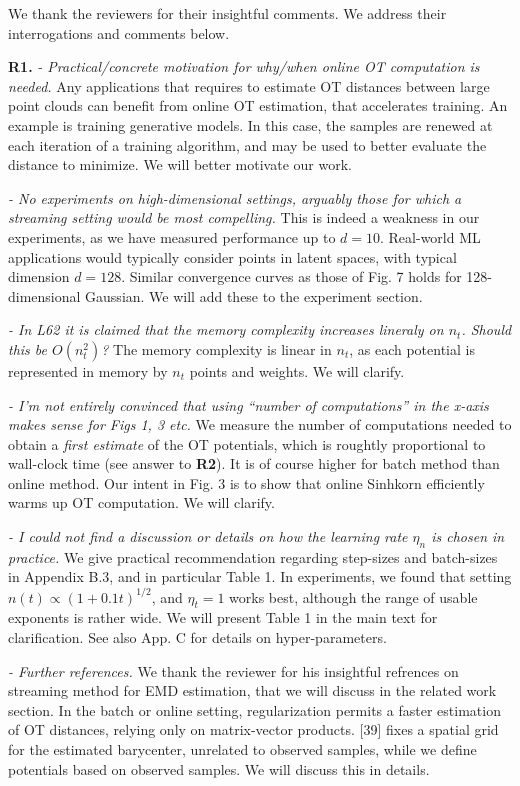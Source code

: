 \documentclass{article}
\begin{document}
We thank the reviewers for their insightful comments. We address their interrogations and comments below.

\textbf{R1.} \textit{- Practical/concrete motivation for why/when online OT computation is needed.} Any applications that requires to estimate OT distances between large point clouds can benefit from online OT estimation, that accelerates training. An example is training generative models. In this case, the samples are renewed at each iteration of a training algorithm, and may be used to better evaluate the distance to minimize. We will better motivate our work.

\textit{- No experiments on high-dimensional settings, arguably those for which a streaming setting would be most compelling.} This is indeed a weakness in our experiments, as we have measured performance up to $d=10$. Real-world ML applications would typically consider points in latent spaces, with typical dimension $d=128$. Similar convergence curves as those of Fig. 7 holds for 128-dimensional Gaussian. We will add these to the experiment section.

\textit{- In L62 it is claimed that the memory complexity increases lineraly on $n_t$. Should this be $O(n_t^2)$?} The memory complexity is linear in $n_t$, as each potential is represented in memory by $n_t$ points and weights. We will clarify.

\textit{- I’m not entirely convinced that using “number of computations” in the x-axis makes sense for Figs 1, 3 etc.} We measure the number of computations needed to obtain a \textit{first estimate} of the OT potentials, which is roughtly proportional to wall-clock time (see answer to \textbf{R2}). It is of course higher for batch method than online method. Our intent in Fig. 3 is to show that online Sinhkorn efficiently warms up OT computation. We will clarify.

\textit{- I could not find a discussion or details on how the learning rate $\eta_n$ is chosen in practice.} We give practical recommendation regarding step-sizes and batch-sizes in Appendix B.3, and in particular Table 1. In experiments, we found that setting $n(t) \propto (1 + 0.1t)^{1/2}$, and $\eta_t = 1$ works best, although the range of usable exponents is rather wide. We will present Table 1 in the main text for clarification. See also App. C for details on hyper-parameters.

\textit{- Further references.} We thank the reviewer for his insightful refrences on streaming method for EMD estimation, that we will discuss in the related work section. In the batch or online setting, regularization permits a faster estimation of OT distances, relying only on matrix-vector products. [39] fixes a spatial grid for the estimated barycenter, unrelated to observed samples, while we define potentials based on observed samples. We will discuss this in details.
\end{document}
